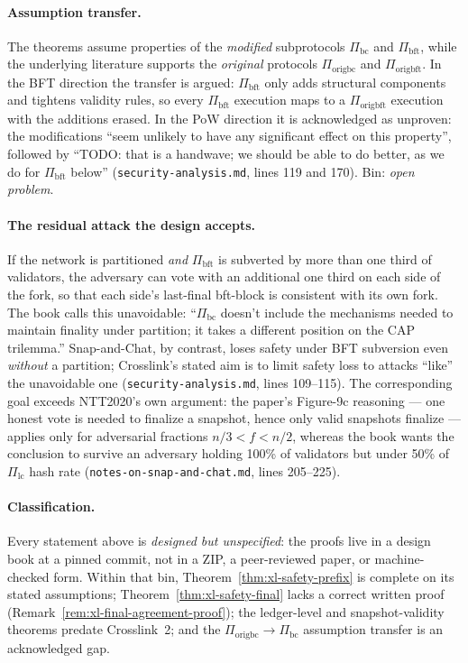 \documentclass[11pt,a4paper]{article}
\theoremstyle{definition}
\begin{document}
\paragraph{Assumption transfer.} The theorems assume properties of the
\emph{modified} subprotocols $\Pi_{\mathrm{bc}}$ and $\Pi_{\mathrm{bft}}$,
while the underlying literature supports the \emph{original} protocols
$\Pi_{\mathrm{origbc}}$ and $\Pi_{\mathrm{origbft}}$. In the BFT
direction the transfer is argued: $\Pi_{\mathrm{bft}}$ only adds
structural components and tightens validity rules, so every
$\Pi_{\mathrm{bft}}$ execution maps to a $\Pi_{\mathrm{origbft}}$
execution with the additions erased. In the PoW direction it is
acknowledged as unproven: the modifications ``seem unlikely to have any
significant effect on this property'', followed by ``TODO: that is a
handwave; we should be able to do better, as we do for
$\Pi_{\mathrm{bft}}$ below'' (\texttt{security-analysis.md}, lines 119 and
170). Bin: \emph{open problem}.

\paragraph{The residual attack the design accepts.} If the network is
partitioned \emph{and} $\Pi_{\mathrm{bft}}$ is subverted by more than one
third of validators, the adversary can vote with an additional one third
on each side of the fork, so that each side's last-final bft-block is
consistent with its own fork. The book calls this unavoidable:
``$\Pi_{\mathrm{bc}}$ doesn't include the mechanisms needed to maintain
finality under partition; it takes a different position on the CAP
trilemma.'' Snap-and-Chat, by contrast, loses safety under BFT subversion
even \emph{without} a partition; Crosslink's stated aim is to limit safety
loss to attacks ``like'' the unavoidable one
(\texttt{security-analysis.md}, lines 109--115). The corresponding goal
exceeds NTT2020's own argument: the paper's Figure-9c reasoning --- one
honest vote is needed to finalize a snapshot, hence only valid snapshots
finalize --- applies only for adversarial fractions $n/3 < f < n/2$,
whereas the book wants the conclusion to survive an adversary holding
100\% of validators but under 50\% of $\Pi_{\mathrm{lc}}$ hash rate
(\texttt{notes-on-snap-and-chat.md}, lines 205--225).

\paragraph{Classification.} Every statement above is \emph{designed but
unspecified}: the proofs live in a design book at a pinned commit, not in
a ZIP, a peer-reviewed paper, or machine-checked form. Within that bin,
Theorem~\ref{thm:xl-safety-prefix} is complete on its stated assumptions;
Theorem~\ref{thm:xl-safety-final} lacks a correct written proof
(Remark~\ref{rem:xl-final-agreement-proof}); the ledger-level and
snapshot-validity theorems predate Crosslink~2; and the
$\Pi_{\mathrm{origbc}} \to \Pi_{\mathrm{bc}}$ assumption transfer is an
acknowledged gap.
\end{document}
